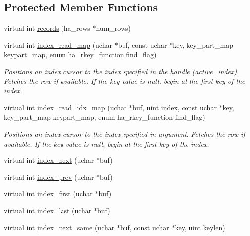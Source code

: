 \subsection*{Protected Member Functions}
\begin{DoxyCompactItemize}
\item 
virtual int \mbox{\hyperlink{classhandler_ae5b7b96354fd25da35a940e656d91940}{records}} (ha\+\_\+rows $\ast$num\+\_\+rows)
\item 
virtual int \mbox{\hyperlink{classhandler_af8c2b258691e5baac8dd22d19c084b37}{index\+\_\+read\+\_\+map}} (uchar $\ast$buf, const uchar $\ast$key, key\+\_\+part\+\_\+map keypart\+\_\+map, enum ha\+\_\+rkey\+\_\+function find\+\_\+flag)
\begin{DoxyCompactList}\small\item\em Positions an index cursor to the index specified in the handle (\textquotesingle{}active\+\_\+index\textquotesingle{}). Fetches the row if available. If the key value is null, begin at the first key of the index. \end{DoxyCompactList}\item 
virtual int \mbox{\hyperlink{classhandler_acba0c549a00023dd44682cd9452cf830}{index\+\_\+read\+\_\+idx\+\_\+map}} (uchar $\ast$buf, uint index, const uchar $\ast$key, key\+\_\+part\+\_\+map keypart\+\_\+map, enum ha\+\_\+rkey\+\_\+function find\+\_\+flag)
\begin{DoxyCompactList}\small\item\em Positions an index cursor to the index specified in argument. Fetches the row if available. If the key value is null, begin at the first key of the index. \end{DoxyCompactList}\item 
virtual int \mbox{\hyperlink{classhandler_aca48f687872e10a4fdc35b418d98b761}{index\+\_\+next}} (uchar $\ast$buf)
\item 
virtual int \mbox{\hyperlink{classhandler_a1ab892ae78db6437119d2d25621118b7}{index\+\_\+prev}} (uchar $\ast$buf)
\item 
virtual int \mbox{\hyperlink{classhandler_af37bd518c53c966459632584c34855d0}{index\+\_\+first}} (uchar $\ast$buf)
\item 
virtual int \mbox{\hyperlink{classhandler_aa1d62ffab7408a031b13e547eb58be09}{index\+\_\+last}} (uchar $\ast$buf)
\item 
virtual int \mbox{\hyperlink{classhandler_a5459b92420f74e6f88dec137e1941d22}{index\+\_\+next\+\_\+same}} (uchar $\ast$buf, const uchar $\ast$key, uint keylen)
\item 

\end{DoxyCompactItemize}
